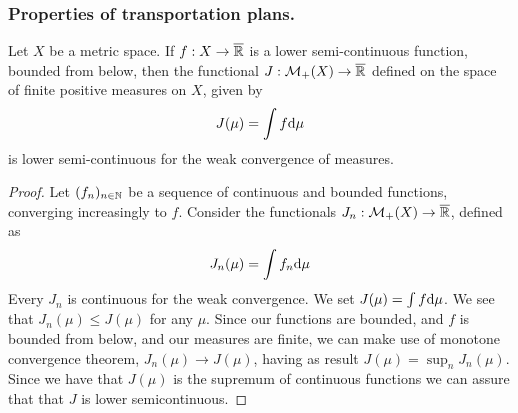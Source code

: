 \subsubsection{Properties of transportation plans.}
\begin{lemma}
	Let $X$ be a metric space. If $f:X\rightarrow\overline{\mathbb{R}}$ is a lower semi-continuous function, bounded from below, then the functional  $J:\mathcal{M}_+(X)\rightarrow \overline{\mathbb{R}}$ defined on the space of finite positive measures on $X$, given by
	\begin{equation*}
	J(\mu)=\int f \mathrm{d}\mu
	\end{equation*} 
	is lower semi-continuous for the weak convergence of measures. \label{lemma: Monotone Convergence implies l.s.c}
\end{lemma}
\begin{proof}
	Let $(f_n)_{n\in \mathbb{N}}$ be a sequence of continuous and bounded functions, converging increasingly to $f$. Consider the functionals $J_n: \mathcal{M}_+(X)\rightarrow\overline{\mathbb{R}}$, defined as
	\begin{equation*}
	J_n(\mu)=\int f_n \mathrm{d}\mu
	\end{equation*}	
	Every $J_n$ is continuous for the weak convergence. We set $J(\mu)=\int f \mathrm{d}\mu$. We see that $J_n(\mu) \leq J(\mu)$ for any $\mu$. Since our functions are bounded, and $f$ is bounded from below, and our measures are finite, we can make use of monotone convergence theorem, $J_n(\mu)\rightarrow J(\mu)$, having as result $J(\mu)=\sup_{n} J_n(\mu)$. Since we have that $J(\mu)$ is the supremum of continuous functions we can assure that that $J$ is lower semicontinuous.
\end{proof}
